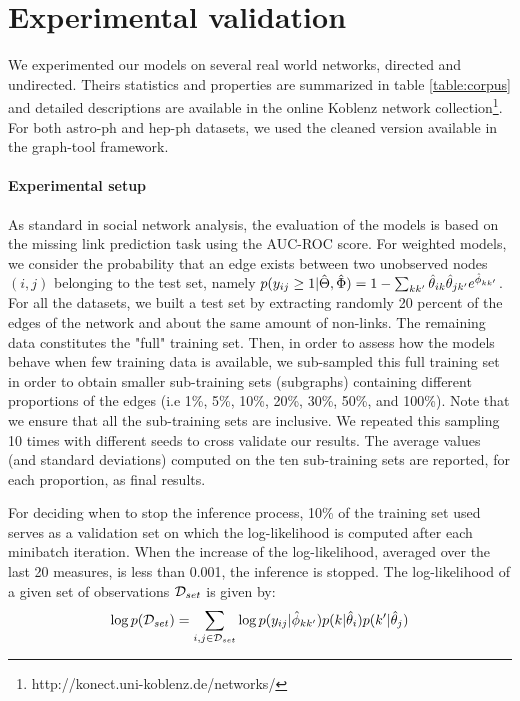 \section{Experimental validation}
\label{sec:exps}

We experimented our models on several real world networks, directed and undirected. Theirs statistics and properties are summarized in table \ref{table:corpus} and detailed descriptions are available in the online Koblenz network collection\footnote{http://konect.uni-koblenz.de/networks/}. For both astro-ph and hep-ph datasets, we used the cleaned version available in the  graph-tool framework.

\begin{table}[h]
\bgroup
\def\arraystretch{1} %
	
\egroup
\label{table:corpus}
\end{table}

\paragraph{Experimental setup} As standard in social network analysis, the evaluation of the models is based on the missing link prediction task using the AUC-ROC score. For weighted models, we consider the probability that an edge exists between two unobserved nodes $(i,j)$ belonging to the test set, namely $p(y_{ij} \geq 1 | \hat\Theta, \hat\Phi) = 1 - \sum_{kk'} \hat\theta_{ik} \hat\theta_{jk'} e^{\hat\phi_{kk'}}$. For all the datasets, we built a test set by extracting randomly 20 percent of the edges of the network and about the same amount of non-links. The remaining data constitutes the "full" training set. Then, in order to assess how the models behave when few training data is available, we sub-sampled this full training set in order to obtain smaller sub-training sets (subgraphs) containing different proportions of the edges (i.e 1\%, 5\%, 10\%, 20\%, 30\%, 50\%, and 100\%). Note that we ensure that all the sub-training sets are inclusive. We repeated this sampling 10 times with different seeds to cross validate our results. The average values (and standard deviations) computed on the ten sub-training sets are reported, for each proportion, as final results.

For deciding when to stop the inference process, 10\% of the training set used serves as a validation set on which the log-likelihood is computed after each minibatch iteration. When the increase of the log-likelihood, averaged over the last 20 measures, is less than 0.001, the inference is stopped. The log-likelihood of a given set of observations $\mathcal{D}_{set}$  is given by:
\begin{equation*}
\log p(\mathcal{D}_{set}) = \sum_{i,j \in \mathcal{D}_{set}} \log p(y_{ij} | \hat\phi_{kk'}) p(k|\hat\theta_i) p(k'|\hat\theta_j)
\end{equation*}

